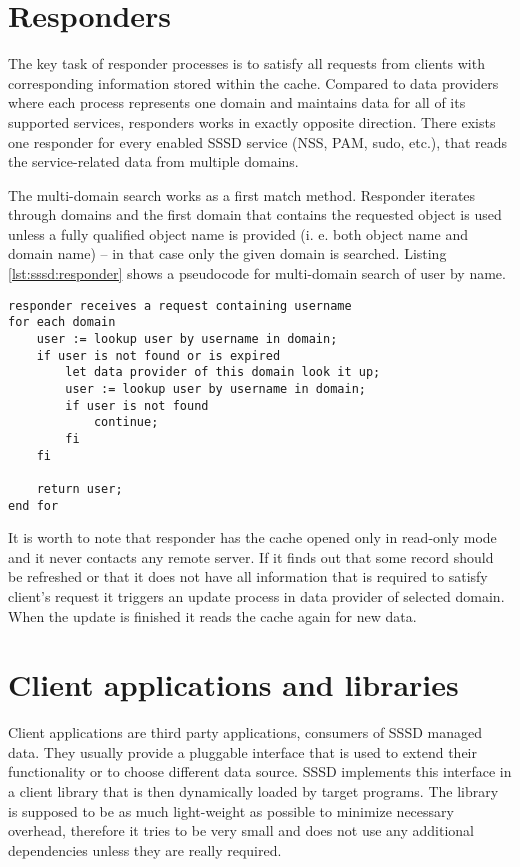 \section{Responders}
\label{sssd:responders}

The key task of responder processes is to satisfy all requests from clients with
corresponding information stored within the cache. Compared to data providers
where each process represents one domain and maintains data for all of its
supported services, responders works in exactly opposite direction. There exists
one responder for every enabled SSSD service (NSS, PAM, sudo, etc.), that reads
the service-related data from multiple domains.

The multi-domain search works as a first match method. Responder iterates
through domains and the first domain that contains the requested object is used
unless a fully qualified object name is provided (i. e. both object name and
domain name) -- in that case only the given domain is searched. Listing
\ref{lst:sssd:responder} shows a pseudocode for multi-domain search of user by
name.

\begin{lstlisting}[caption={Multi-domain lookup (get user by name)},
morekeywords={end, fi, each},label=lst:sssd:responder]
responder receives a request containing username
for each domain
    user := lookup user by username in domain;
    if user is not found or is expired
        let data provider of this domain look it up;
        user := lookup user by username in domain;
        if user is not found
            continue;
        fi
    fi

    return user;
end for
\end{lstlisting}

It is worth to note that responder has the cache opened only in read-only mode
and it never contacts any remote server. If it finds out that some record should
be refreshed or that it does not have all information that is required to
satisfy client's request it triggers an update process in data provider of
selected domain. When the update is finished it reads the cache again for new
data.

\section{Client applications and libraries}
\label{sssd:clients}

Client applications are third party applications, consumers of SSSD managed
data. They usually provide a pluggable interface that is used to extend their
functionality or to choose different data source. SSSD implements this interface
in a client library that is then dynamically loaded by target programs. The
library is supposed to be as much light-weight as possible to minimize necessary
overhead, therefore it tries to be very small and does not use any additional
dependencies unless they are really required.

